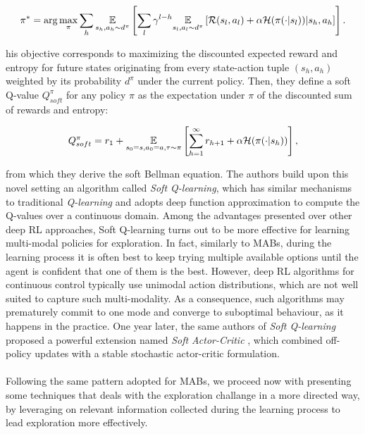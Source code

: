 \begin{align}
\pi^*=\arg\max_\pi\sum_h\underset{s_h,a_h\sim d^{\pi}}{\mathbb{E}}\left[{\sum_l\gamma^{l-h}\underset{s_l,a_l\sim d^{\pi}}{\mathbb{E}}\left[{\mathcal{R}(s_l,a_l)+\alpha\mathcal{H}(\pi(\cdot|s_l))|s_h,a_h}\right]}\right].
\end{align}

his objective corresponds to maximizing the discounted expected reward and entropy for future states originating from every state-action tuple $(s_h,a_h)$ weighted by its probability $d^{\pi}$ under the current policy. Then, they define a soft Q-value $Q_{soft}^{\pi}$ for any policy $\pi$ as the expectation under $\pi$ of the discounted sum of rewards and entropy:

\begin{align}
Q_{soft}^{\pi}=r_1 + \underset{s_0=s,a_0=a,\tau\sim\pi}{\mathbb{E}}\left[{\sum_{h=1}^{\infty}r_{h+1}+\alpha\mathcal{H}(\pi(\cdot|s_h))}\right],
\end{align}

from which they derive the soft Bellman equation. The authors build upon this novel setting an algorithm called \emph{Soft Q-learning}, which has similar mechanisms to traditional \emph{Q-learning} and adopts deep function approximation to compute the Q-values over a continuous domain. Among the advantages presented over other deep \gls{RL} approaches, Soft Q-learning turns out to be more effective for learning multi-modal policies for exploration. In fact, similarly to \gls{MAB}s, during the learning process it is often best to keep trying multiple available options until the agent is confident that one of them is the best. However, deep \gls{RL} algorithms for continuous control typically use unimodal action distributions, which are not well suited to capture such multi-modality. As a consequence, such algorithms may prematurely commit to one mode and converge to suboptimal behaviour, as it happens in the practice.
One year later, the same authors of \emph{Soft Q-learning} \cite{haarnoja2017reinforcement} proposed a powerful extension named \emph{Soft Actor-Critic} \cite{haarnoja2018soft}, which combined off-policy updates with a stable stochastic actor-critic formulation.  \\\\
Following the same pattern adopted for \gls{MAB}s, we proceed now with presenting some techniques that deals with the exploration challange in a more directed way, \ie by leveraging on relevant information collected during the learning process to lead exploration more effectively.

